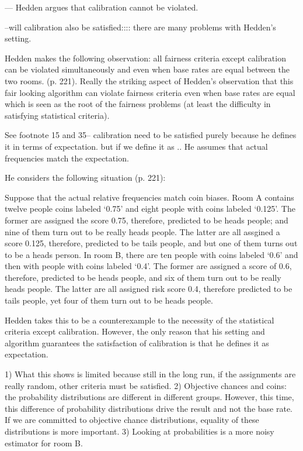 \documentclass{article}
\begin{document}
--- Hedden argues that calibration cannot be violated. 

--will calibration also be satisfied:::: there are many problems with Hedden's setting.  

Hedden makes the following observation: all fairness criteria except calibration can be violated simultaneously and even when base rates are equal between the two rooms. (p. 221). Really the striking aspect of Hedden's observation that this fair looking algorithm can violate fairness criteria even when base rates are equal which is seen as the root of the fairness problems (at least the difficulty in satisfying statistical criteria).


See footnote 15 and 35-- calibration need to be satisfied purely because he defines it in terms of expectation. but if we define it as .. He assumes that actual frequencies match the expectation. 


He considers the following situation (p. 221):  

Suppose that the actual relative frequencies match coin biases. Room A contains twelve people coins labeled   `0.75' and eight people with coins labeled `0.125'. The former are assigned the score 0.75, therefore, predicted to be heads people; and nine of them turn out to be really heads people. The latter are all assgined a score 0.125, therefore, predicted to be tails people, and but one of them turns out to be a heads person. In room B, there are ten people with coins labeled `0.6' and then with people with coins labeled `0.4'. The former are assigned a score of 0.6, therefore, predicted to be heads people, and six of them turn out to be really heads people. The latter are all assigned risk score 0.4, therefore predicted to be tails people, yet four of them turn out to be heads people. 

Hedden takes this to be a counterexample to the necessity of the statistical criteria except calibration. However, the only reason that his setting and algorithm guarantees the satisfaction of calibration is that he defines it as expectation. 

1) What this shows is limited because still in the long run, if the assignments are really random, other criteria must be satisfied. 
2) Objective chances and coins: the probability distributions are different in different groups. However, this time, this difference of probability distributions drive the result and not the base rate. If we are committed to objective chance distributions, equality of these distributions is more important. 
3) Looking at probabilities is a more noisy estimator for room B. 
\end{document}
